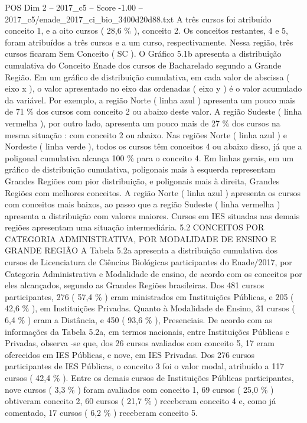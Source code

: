 \begin{textsample}{POS Dim 2 – 2017\_c5 – Score -1.00 – 2017\_c5/enade\_2017\_ci\_bio\_3400d20d88.txt}
A três cursos foi atribuído conceito 1, e a oito cursos ( 28,6 \% ), conceito 2.
Os conceitos restantes, 4 e 5, foram atribuídos a três cursos e a um curso, respectivamente.
Nessa região, três cursos ficaram Sem Conceito ( SC ).
O Gráfico 5.1b apresenta a distribuição cumulativa do Conceito Enade dos cursos de Bacharelado segundo a Grande Região.
Em um gráfico de distribuição cumulativa, em cada valor de abscissa ( eixo x ), o valor apresentado no eixo das ordenadas ( eixo y ) é o valor acumulado da variável.
Por exemplo, a região Norte ( linha azul ) apresenta um pouco mais de 71 \% dos cursos com conceito 2 ou abaixo deste valor.
A região Sudeste ( linha vermelha ), por outro lado, apresenta um pouco mais de 27 \% dos cursos na mesma situação : com conceito 2 ou abaixo.
Nas regiões Norte ( linha azul ) e Nordeste ( linha verde ), todos os cursos têm conceitos 4 ou abaixo disso, já que a poligonal cumulativa alcança 100 \% para o conceito 4.
Em linhas gerais, em um gráfico de distribuição cumulativa, poligonais mais à esquerda representam Grandes Regiões com pior distribuição, e poligonais mais à direita, Grandes Regiões com melhores conceitos.
A região Norte ( linha azul ) apresenta os cursos com conceitos mais baixos, ao passo que a região Sudeste ( linha vermelha ) apresenta a distribuição com valores maiores.
Cursos em IES situadas nas demais regiões apresentam uma situação intermediária. 5.2 CONCEITOS POR CATEGORIA ADMINISTRATIVA, POR MODALIDADE DE ENSINO E GRANDE REGIÃO A Tabela 5.2a apresenta a distribuição cumulativa dos cursos de Licenciatura de Ciências Biológicas participantes do Enade/2017, por Categoria Administrativa e Modalidade de ensino, de acordo com os conceitos por eles alcançados, segundo as Grandes Regiões brasileiras.
Dos 481 cursos participantes, 276 ( 57,4 \% ) eram ministrados em Instituições Públicas, e 205 ( 42,6 \% ), em Instituições Privadas.
Quanto à Modalidade de Ensino, 31 cursos ( 6,4 \% ) eram a Distância, e 450 ( 93,6 \% ), Presenciais.
De acordo com as informações da Tabela 5.2a, em termos nacionais, entre Instituições Públicas e Privadas, observa -se que, dos 26 cursos avaliados com conceito 5, 17 eram oferecidos em IES Públicas, e nove, em IES Privadas.
Dos 276 cursos participantes de IES Públicas, o conceito 3 foi o valor modal, atribuído a 117 cursos ( 42,4 \% ).
Entre os demais cursos de Instituições Públicas participantes, nove cursos ( 3,3 \% ) foram avaliados com conceito 1, 69 cursos ( 25,0 \% ) obtiveram conceito 2, 60 cursos ( 21,7 \% ) receberam conceito 4 e, como já comentado, 17 cursos ( 6,2 \% ) receberam conceito 5.

\end{textsample}
